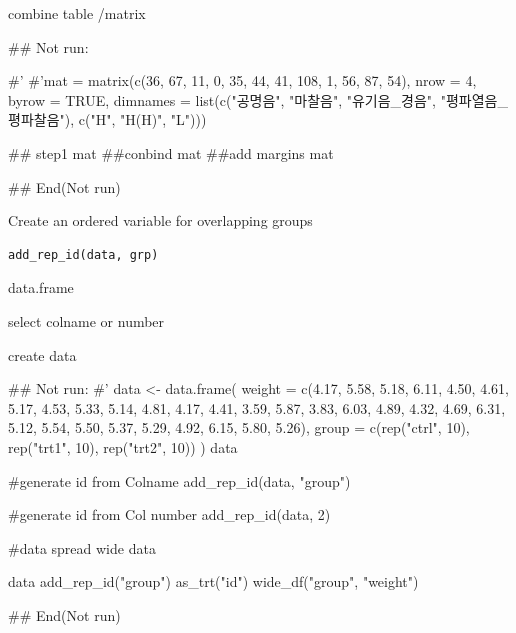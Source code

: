 \documentclass[a4paper]{book}
\begin{document}
%
\begin{Value}
combine table /matrix
\end{Value}
%
\begin{Examples}
\begin{ExampleCode}

## Not run: 

#' #'mat = matrix(c(36, 67, 11,
          0, 35, 44,
         41, 108, 1,
          56, 87, 54),
           nrow = 4, byrow = TRUE,
   dimnames = list(c("공명음", "마찰음",
     "유기음_경음", "평파열음_평파찰음"),  c("H", "H(H)", "L")))

## step1
  mat %
##conbind
 mat %
##add margins
 mat %

## End(Not run)


\end{ExampleCode}
\end{Examples}
%
\begin{Description}
Create an ordered variable for overlapping groups
\end{Description}
%
\begin{Usage}
\begin{verbatim}
add_rep_id(data, grp)
\end{verbatim}
\end{Usage}
%
\begin{Arguments}
\begin{ldescription}
\item[\code{data}] data.frame

\item[\code{grp}] select colname or number
\end{ldescription}
\end{Arguments}
%
\begin{Value}
create data
\end{Value}
%
\begin{Examples}
\begin{ExampleCode}

## Not run: 
#'
data <- data.frame(
  weight = c(4.17, 5.58, 5.18, 6.11, 4.50, 4.61, 5.17, 4.53, 5.33, 5.14,
             4.81, 4.17, 4.41, 3.59, 5.87, 3.83, 6.03, 4.89, 4.32, 4.69,
             6.31, 5.12, 5.54, 5.50, 5.37, 5.29, 4.92, 6.15, 5.80, 5.26),
  group = c(rep("ctrl", 10), rep("trt1", 10), rep("trt2", 10))
)
data

#generate id from Colname
add_rep_id(data, "group")

#generate id from Col number
add_rep_id(data, 2)

#data spread wide
data%


data%
  add_rep_id("group")%
  as_trt("id") %
  wide_df("group", "weight")


## End(Not run)


\end{ExampleCode}
\end{Examples}
\end{document}
